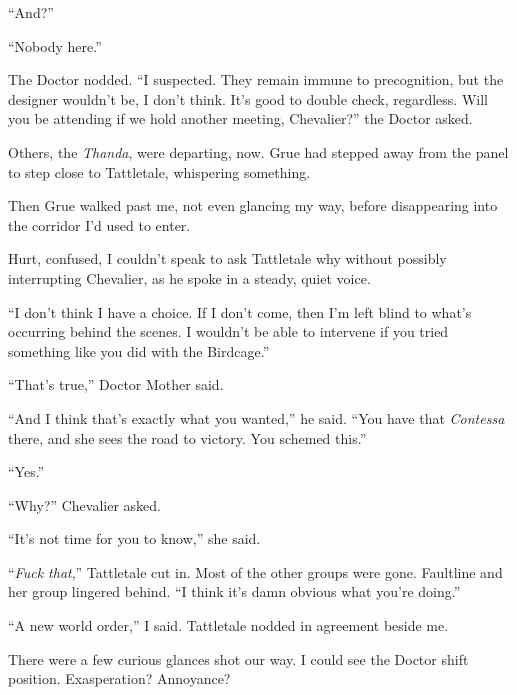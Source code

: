 ``And?''



``Nobody here.''



The Doctor nodded.  ``I suspected.  They remain immune to precognition, but the designer wouldn't be, I don't think.  It's good to double check, regardless.  Will you be attending if we hold another meeting, Chevalier?'' the Doctor asked.



Others, the \emph{Thanda}, were departing, now.  Grue had stepped away from the panel to step close to Tattletale, whispering something.



Then Grue walked past me, not even glancing my way, before disappearing into the corridor I'd used to enter.



Hurt, confused, I couldn't speak to ask Tattletale why without possibly interrupting Chevalier, as he spoke in a steady, quiet voice.



``I don't think I have a choice.  If I don't come, then I'm left blind to what's occurring behind the scenes.  I wouldn't be able to intervene if you tried something like you did with the Birdcage.''



``That's true,'' Doctor Mother said.



``And I think that's exactly what you wanted,'' he said.  ``You have that \emph{Contessa} there, and she sees the road to victory.  You schemed this.''



``Yes.''



``Why?''  Chevalier asked.



``It's not time for you to know,'' she said.



``\emph{Fuck that},'' Tattletale cut in.  Most of the other groups were gone.  Faultline and her group lingered behind.  ``I think it's damn obvious what you're doing.''



``A new world order,'' I said.  Tattletale nodded in agreement beside me.



There were a few curious glances shot our way.  I could see the Doctor shift position.  Exasperation?  Annoyance?




